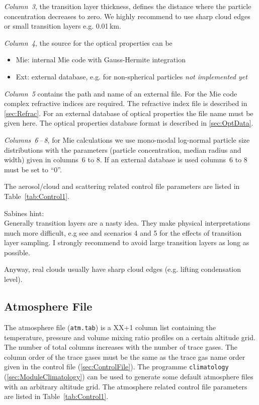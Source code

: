 \emph{Column~3}, the transition layer thickness, defines the distance where the particle concentration decreases to zero. We highly recommend to use sharp cloud edges or small transition layers e.g. 0.01\,km.

\emph{Column~4}, the source for the optical properties can be
\begin{itemize}
\item Mie: internal Mie code with Gauss-Hermite integration
\item Ext: external database, e.g. for non-spherical particles \emph{not implemented yet}
\end{itemize}

\emph{Column~5} contains the path and name of an external file. For the Mie code complex refractive indices are required. The refractive index file is described in \ref{sec:Refrac}. For an external database of optical properties the file name must be given here. The optical properties database format is described in \ref{sec:OptData}.

\emph{Columns~6\,--\,8}, for Mie calculations we use mono-modal log-normal particle size distributions with the parameters (particle concentration, median radius and width) given in columns~6 to 8. If an external database is used columns~6 to 8 must be set to ``0''. %

The aerosol/cloud and scattering related control file parameters are listed in Table~\ref{tab:Control1}.

Sabines hint:\\
Generally transition layers are a nasty idea. They make physical interpretations much more difficult, e.g see \citet{Griessbach2013} and \citet{Hoepfner2009} scenarios 4 and 5 for the effects of transition layer sampling. I strongly recommend to avoid large transition layers as long as possible.

Anyway, real clouds usually have sharp cloud edges (e.g. lifting condensation level).


\subsection{Atmosphere File}
\label{sec:AtmosphereFile}
The atmosphere file (\texttt{atm.tab}) is a XX+1 column list containing the temperature, pressure and volume mixing ratio profiles on a certain altitude grid. The number of total columns increases with the number of trace gases. The column order of the trace gases must be the same as the trace gas name order given in the control file (\ref{sec:ControlFile}). The programme \texttt{climatology} (\ref{sec:ModuleClimatology}) can be used to generate some default atmosphere files with an arbitrary altitude grid. The atmosphere related control file parameters are listed in Table~\ref{tab:Control1}.

